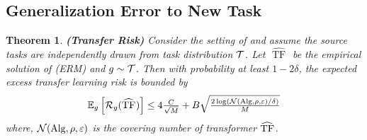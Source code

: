 \documentclass[10pt]{article}
\theoremstyle{plain}
\newtheorem{theorem}{Theorem}[section]
\theoremstyle{definition}
\theoremstyle{remark}
\begin{document}
\subsection{Generalization Error to New Task}
\label{app:transfer}
\begin{theorem}\textbf{(Transfer Risk)}
Consider the setting of  and assume the source tasks are independently drawn from task distribution $\mathcal{T}$. Let $\widehat{\text { TF }}$ be the empirical solution of (ERM) and $g \sim \mathcal{T}$. Then with probability at least $1-2 \delta$, the expected excess transfer learning risk is bounded by
\begin{align*}
\mathbb{E}_{g}\left[\mathcal{R}_{g}(\widehat{\mathrm{TF}}_{})\right] \leq 4 \tfrac{C}{\sqrt{M}} +B \sqrt{\tfrac{2 \log (\mathcal{N}(\mathrm{Alg}, \rho, \varepsilon) / \delta)}{M}}
\end{align*}
where, $\mathcal{N}(\mathrm{Alg}, \rho, \varepsilon)$ is the covering number of transformer $\widehat{\mathrm{TF}}_{}$.
\end{theorem}
\end{document}
